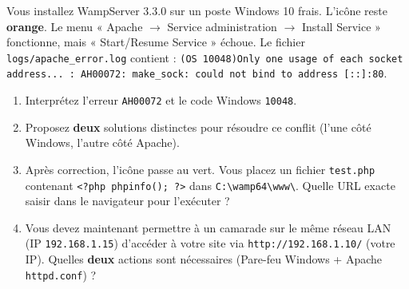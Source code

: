 \documentclass[11pt]{article}
\begin{document}
\begin{exercice}
Vous installez WampServer 3.3.0 sur un poste Windows 10 frais. L'icône reste \textbf{orange}. Le menu « Apache $\rightarrow$ Service administration $\rightarrow$ Install Service » fonctionne, mais « Start/Resume Service » échoue. Le fichier \texttt{logs/apache\_error.log} contient : \texttt{(OS 10048)Only one usage of each socket address... : AH00072: make\_sock: could not bind to address [::]:80}.
\begin{enumerate}
\item Interprétez l'erreur \texttt{AH00072} et le code Windows \texttt{10048}.
\item Proposez \textbf{deux} solutions distinctes pour résoudre ce conflit (l'une côté Windows, l'autre côté Apache).
\item Après correction, l'icône passe au vert. Vous placez un fichier \texttt{test.php} contenant \texttt{<?php phpinfo(); ?>} dans \texttt{C:\textbackslash wamp64\textbackslash www\textbackslash}. Quelle URL exacte saisir dans le navigateur pour l'exécuter ?
\item Vous devez maintenant permettre à un camarade sur le même réseau LAN (IP \texttt{192.168.1.15}) d'accéder à votre site via \texttt{http://192.168.1.10/} (votre IP). Quelles \textbf{deux} actions sont nécessaires (Pare-feu Windows + Apache \texttt{httpd.conf}) ?
\end{enumerate}
\end{exercice}
\end{document}
